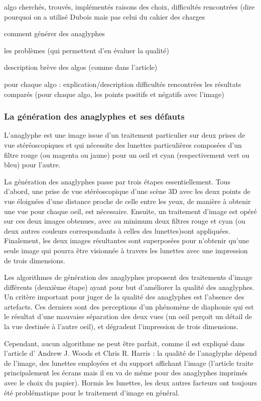 algo cherchés, trouvés, implémentés
  raisons des choix, difficultés rencontrées
  (dire pourquoi on a utilisé Dubois mais pas celui du cahier des charges


comment générer des anaglyphes 

les problèmes (qui permettent d'en évaluer la qualité)

description brève des algos (comme dans l'article)

pour chaque algo : 
	explication/description
	difficultés rencontrées
 	les résultats comparés (pour chaque algo, les points positifs et négatifs avec l'image)

\subsubsection{La génération des anaglyphes et ses défauts}
	L'anaglyphe est une image issue d'un traitement particulier sur deux prises de vue stéréoscopiques et qui nécessite des lunettes particulières composées d'un filtre rouge (ou magenta ou jaune) pour un oeil et cyan (respectivement vert ou bleu) pour l'autre. 
	
	La génération des anaglyphes passe par trois étapes essentiellement. Tous d'abord, une prise de vue stéréoscopique d'une scène 3D avec les deux points de vue éloignées d'une distance proche de celle entre les yeux, de manière à obtenir une vue pour chaque oeil, est nécessaire. Ensuite, un traitement d'image est opéré sur ces deux images obtenues, avec au minimum deux filtres rouge et cyan (ou deux autres couleurs correspondants à celles des lunettes)sont appliquées. Finalement, les deux images résultantes sont superposées pour n'obtenir qu'une seule image qui pourra être visionnée à travers les lunettes avec une impression de trois dimensions.
	
	Les algorithmes de génération des anaglyphes proposent des traitements d'image différents (deuxième étape) ayant pour but d'améliorer la qualité des anaglyphes. Un critère important pour juger de la qualité des anaglyphes est l'absence des artefacts. Ces derniers sont des perceptions d'un phénomène de diaphonie qui est le résultat d'une mauvaise séparation des deux vues (un oeil perçoit un détail de la vue destinée à l'autre oeil), et dégradent l'impression de trois dimensions. %

	Cependant, aucun algorithme ne peut être parfait, comme il est expliqué dans l'article d' Andrew J. Woods et Chris R. Harris \cite{anaglypheDefaut}  : la qualité de l'anaglyphe dépend de l'image, des lunettes employées et du support affichant l'image (l'article traite principalement les écrans mais il en va de même pour des anaglyphes imprimés avec le choix du papier). Hormis les lunettes, les deux autres facteurs ont toujours été problématique pour le traitement d'image en général.  
	
